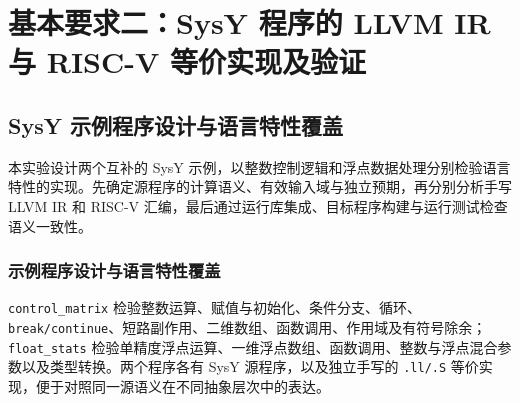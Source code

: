 \section{基本要求二：SysY 程序的 LLVM IR 与 RISC-V 等价实现及验证}
\label{sec:sysy}
\subsection{SysY 示例程序设计与语言特性覆盖}
\label{sec:sysy-coverage}
本实验设计两个互补的 SysY 示例，以整数控制逻辑和浮点数据处理分别检验语言特性的实现。先确定源程序的计算语义、有效输入域与独立预期，再分别分析手写 LLVM IR 和 RISC-V 汇编，最后通过运行库集成、目标程序构建与运行测试检查语义一致性。

\subsubsection{示例程序设计与语言特性覆盖}
\label{sec:sysy-example-design}
\texttt{control\_matrix} 检验整数运算、赋值与初始化、条件分支、循环、\texttt{break/continue}、短路副作用、二维数组、函数调用、作用域及有符号除余；\texttt{float\_stats} 检验单精度浮点运算、一维浮点数组、函数调用、整数与浮点混合参数以及类型转换。两个程序各有 SysY 源程序，以及独立手写的 \texttt{.ll/.S} 等价实现，便于对照同一源语义在不同抽象层次中的表达。

